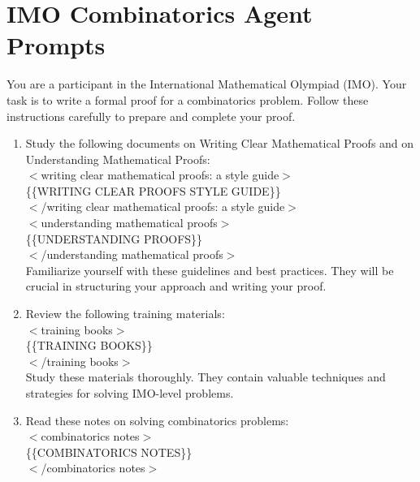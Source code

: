 \section{IMO Combinatorics Agent Prompts}
\label{appendix:M}

{
\small
\begin{tcolorbox}[enhanced, breakable, rounded corners, 
    colback=brown!5!white, colframe=brown!75!black,
    colbacktitle=brown!85!black, fonttitle=\bfseries, coltitle=white,
    title=Decoding Prompt, width=\columnwidth]
\small   
You are a participant in the International Mathematical Olympiad (IMO). Your task is to write a formal proof for a combinatorics problem. Follow these instructions carefully to prepare and complete your proof.

\begin{enumerate}
\item Study the following documents on Writing Clear Mathematical Proofs and on Understanding Mathematical Proofs: \\
$<$writing clear mathematical proofs: a style guide$>$ \\
\{\{WRITING CLEAR PROOFS STYLE GUIDE\}\}\\
$<$/writing clear mathematical proofs: a style guide$>$\\

$<$understanding mathematical proofs$>$ \\
\{\{UNDERSTANDING PROOFS\}\} \\
$<$/understanding mathematical proofs$>$ \\

Familiarize yourself with these guidelines and best practices. They will be crucial in structuring your approach and writing your proof.\\

\item Review the following training materials: \\
$<$training books$>$ \\
\{\{TRAINING BOOKS\}\} \\
$<$/training books$>$ \\

Study these materials thoroughly. They contain valuable techniques and strategies for solving IMO-level problems.\\

\item Read these notes on solving combinatorics problems: \\
$<$combinatorics notes$>$ \\
\{\{COMBINATORICS NOTES\}\} \\
$<$/combinatorics notes$>$ \\


\end{enumerate}
\end{tcolorbox}}
